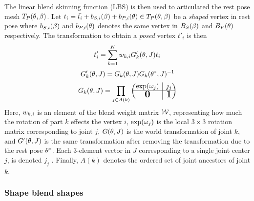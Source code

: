 The linear blend skinning function (LBS) is then used to articulated the rest pose mesh $T_{P}(\theta,\beta)$. Let $t_{i} = \bar{t_{i}} + b_{S,i}(\beta) + b_{P,i}(\theta) \in T_{P}(\theta,\beta)$ be a \emph{shaped} vertex in rest pose where $b_{S,i}(\beta)$ and $b_{P, i}(\theta)$ denotes the same vertex in $B_{S}(\beta)$ and $B_{P}(\theta)$ respectively. The transformation to obtain a \emph{posed} vertex $t'_{i}$ is then
\begin{equation}
    t'_{i} = \sum_{k=1}^{K} w_{k,i} G_{k}'(\theta,J)t_{i}
\end{equation}
\begin{equation}
    G'_{k}(\theta,J) = G_{k}(\theta,J) G_{k}(\theta^{*},J)^{-1}
\end{equation}
\begin{equation}\label{eqt:kintree_prods}
    G_{k}(\pose,\smalrestJ) = \prod_{j \in A(k)} 
    \begin{pmatrix}
        \exp(\poseele{j})
        & \rvline 
        & j_{j} \\
    \hline
        \bigzero
        & \rvline 
        & \bigone
    \end{pmatrix}
\end{equation}
Here, $w_{k,i}$ is an element of the blend weight matrix $\mathcal{W}$, representing how much the rotation of part $k$ effects the vertex $i$, $\exp(\omega_{j})$ is the local $3 \times 3$ rotation matrix corresponding to joint $j$, $G(\theta,J)$ is the world transformation of joint $k$, and $G'(\theta,J)$ is the same transformation after removing the transformation due to the rest pose $\theta^{*}$. Each $3$-element vector in $J$ corresponding to a single joint center $j$, is denoted $j_{j}$ . Finally, $A(k)$ denotes the ordered set of joint ancestors of joint $k$.



\subsubsection{Shape blend shapes}

